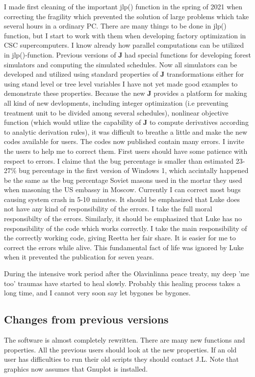 I made first cleaning of the important \textcolor{VioletRed}{jlp}() function in the spring of 2021
when correcting
the fragility which prevented the solution of large problems which take several hours in
a ordinary PC. There are many things to be done in \textcolor{VioletRed}{jlp}() function, but I start
to work with them when developing factory optimization in CSC supercomputers.
I know already how parallel computations can be utilized in \textcolor{VioletRed}{jlp}()-function.
Previous versions of \textbf{J} had special functions for developing forest simulators and
computing the simulated schedules. Now all simulators can be developed and utilized
using standard properties of \textbf{J} transformations either for using stand level
or tree level variables
I have not yet made good examples to demonstrate these properties. Because the new \textbf{J} provides
a platform for making all kind of new devlopments, including
integer optimization (i.e preventing treatment unit to be divided among several
schedules), nonlinear objective function
(which would utlize the capability of \textbf{J} to compute derivatives
according to analytic derivation rules), it was difficult to breathe a little and make the
new codes available for users. The codes now published contain many errors.
I invite the users to help me to correct them. First users should have some
patience with respect to errors. I claime that the bug percentage is smaller than
estimated 23-27\% bug percentage in the first version
of Windows 1, which accintally happened be the same as the bug percentage
Soviet masons used in the mortar they used when masoning the US embassy in Moscow.
Currently I can correct most bugs
causing system crash in 5-10 minutes. It should be emphasized that
Luke does not have any kind of responsibility of the errors.
I take the full moral responsibilty of the errors. Similarly, it should
be emphasized that Luke has no responsibility of the code which works correctly.
I take the main responsibility of the correctly working code,
giving Reetta her fair
share. It is easier for me to correct the errors while alive.
This fundamental fact of life
was ignored by Luke when it prevented the publication for seven years.

During the intensive work period after the Olavinlinna peace treaty, my deep
'me too' traumas have started to heal slowly. Probably this healing process takes
a long time, and I cannot very soon say let bygones be bygones.

\subsection{Changes from previous versions}
\label{changes}
The software is almost  completely rewritten. There are many new
functions and properties. All the previous users should  look at the
new properties.  If an old user has difficulties to run their old scripts they should
contact J.L. Note that graphics now assumes that Gnuplot is installed.

